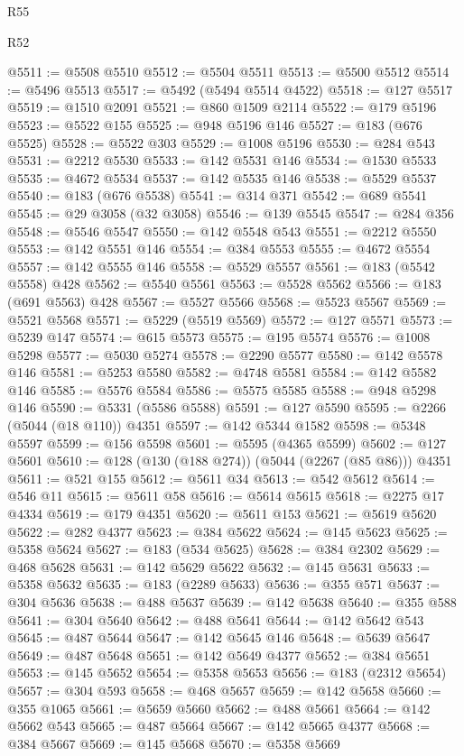 \begin{lexlean}{R55}
\begin{lexlean}{R52}
\begin{coremodule}
{{{{{{{{{{{{{{{{{{{{{{{{{{{{{{{{{{{{{{{{{{{{{{{{{{{{{{{{{{{{{{{{{{{{{{{{{{{{{{{{{{{{{{{{{{{{{{{{{{{{{{{{{{{{{{{{{{{{{{{{{{{{{{{{{{{{{{{{{{{{{{{{{{{{{{{{{{{{{{{{{{{{{{{{{{{{{{{{{{{{{{{{{{{{{{{{{{{{{{@5511 := @5508 @5510
@5512 := @5504 @5511
@5513 := @5500 @5512
@5514 := @5496 @5513
@5517 := @5492 (@5494 @5514 @4522)
@5518 := @127 @5517
@5519 := @1510 @2091
@5521 := @860 @1509 @2114
@5522 := @179 @5196
@5523 := @5522 @155
@5525 := @948 @5196 @146
@5527 := @183 (@676 @5525)
@5528 := @5522 @303
@5529 := @1008 @5196
@5530 := @284 @543
@5531 := @2212 @5530
@5533 := @142 @5531 @146
@5534 := @1530 @5533
@5535 := @4672 @5534
@5537 := @142 @5535 @146
@5538 := @5529 @5537
@5540 := @183 (@676 @5538)
@5541 := @314 @371
@5542 := @689 @5541
@5545 := @29 @3058 (@32 @3058)
@5546 := @139 @5545
@5547 := @284 @356
@5548 := @5546 @5547
@5550 := @142 @5548 @543
@5551 := @2212 @5550
@5553 := @142 @5551 @146
@5554 := @384 @5553
@5555 := @4672 @5554
@5557 := @142 @5555 @146
@5558 := @5529 @5557
@5561 := @183 (@5542 @5558) @428
@5562 := @5540 @5561
@5563 := @5528 @5562
@5566 := @183 (@691 @5563) @428
@5567 := @5527 @5566
@5568 := @5523 @5567
@5569 := @5521 @5568
@5571 := @5229 (@5519 @5569)
@5572 := @127 @5571
@5573 := @5239 @147
@5574 := @615 @5573
@5575 := @195 @5574
@5576 := @1008 @5298
@5577 := @5030 @5274
@5578 := @2290 @5577
@5580 := @142 @5578 @146
@5581 := @5253 @5580
@5582 := @4748 @5581
@5584 := @142 @5582 @146
@5585 := @5576 @5584
@5586 := @5575 @5585
@5588 := @948 @5298 @146
@5590 := @5331 (@5586 @5588)
@5591 := @127 @5590
@5595 := @2266 (@5044 (@18 @110)) @4351
@5597 := @142 @5344 @1582
@5598 := @5348 @5597
@5599 := @156 @5598
@5601 := @5595 (@4365 @5599)
@5602 := @127 @5601
@5610 := @128 (@130 (@188 @274)) (@5044 (@2267 (@85 @86))) @4351
@5611 := @521 @155
@5612 := @5611 @34
@5613 := @542 @5612
@5614 := @546 @11
@5615 := @5611 @58
@5616 := @5614 @5615
@5618 := @2275 @17 @4334
@5619 := @179 @4351
@5620 := @5611 @153
@5621 := @5619 @5620
@5622 := @282 @4377
@5623 := @384 @5622
@5624 := @145 @5623
@5625 := @5358 @5624
@5627 := @183 (@534 @5625)
@5628 := @384 @2302
@5629 := @468 @5628
@5631 := @142 @5629 @5622
@5632 := @145 @5631
@5633 := @5358 @5632
@5635 := @183 (@2289 @5633)
@5636 := @355 @571
@5637 := @304 @5636
@5638 := @488 @5637
@5639 := @142 @5638
@5640 := @355 @588
@5641 := @304 @5640
@5642 := @488 @5641
@5644 := @142 @5642 @543
@5645 := @487 @5644
@5647 := @142 @5645 @146
@5648 := @5639 @5647
@5649 := @487 @5648
@5651 := @142 @5649 @4377
@5652 := @384 @5651
@5653 := @145 @5652
@5654 := @5358 @5653
@5656 := @183 (@2312 @5654)
@5657 := @304 @593
@5658 := @468 @5657
@5659 := @142 @5658
@5660 := @355 @1065
@5661 := @5659 @5660
@5662 := @488 @5661
@5664 := @142 @5662 @543
@5665 := @487 @5664
@5667 := @142 @5665 @4377
@5668 := @384 @5667
@5669 := @145 @5668
@5670 := @5358 @5669
}}}}}}}}}}}}}}}}}}}}}}}}}}}}}}}}}}}}}}}}}}}}}}}}}}}}}}}}}}}}}}}}}}}}}}}}}}}}}}}}}}}}}}}}}}}}}}}}}}}}}}}}}}}}}}}}}}}}}}}}}}}}}}}}}}}}}}}}}}}}}}}}}}}}}}}}}}}}}}}}}}}}}}}}}}}}}}}}}}}}}}}}}}}}}}}}}}}}}}
\end{coremodule}
\end{lexlean}
\end{lexlean}
